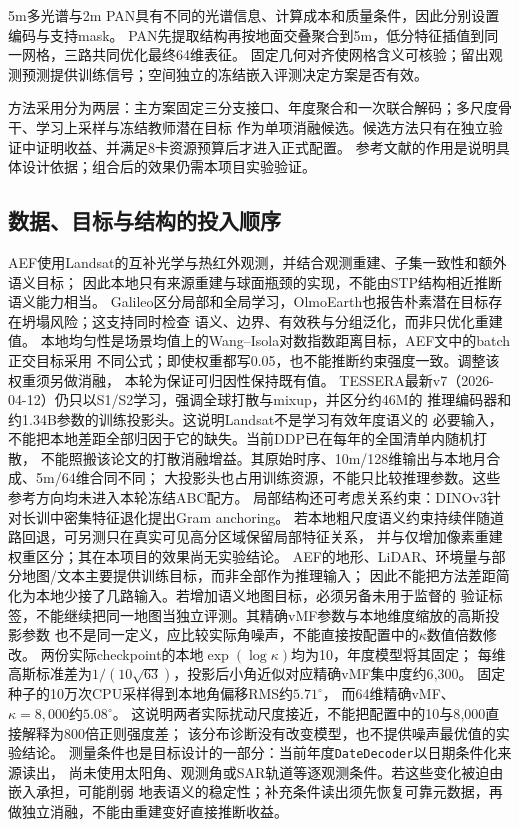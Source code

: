 \documentclass[UTF8,fontset=fandol,zihao=5,a4paper]{ctexart}
\newcommand{\note}[1]{\par\smallskip\noindent\colorbox{pale}{\parbox{0.95\linewidth}{\small #1}}\par\smallskip}
\begin{document}
5m多光谱与2m PAN具有不同的光谱信息、计算成本和质量条件，因此分别设置编码与支持mask。
PAN先提取结构再按地面交叠聚合到5m，低分特征插值到同一网格，三路共同优化最终64维表征。
固定几何对齐使网格含义可核验；留出观测预测提供训练信号；空间独立的冻结嵌入评测决定方案是否有效。

\note{方法采用分为两层：主方案固定三分支接口、年度聚合和一次联合解码；多尺度骨干、学习上采样与冻结教师潜在目标
作为单项消融候选。候选方法只有在独立验证中证明收益、并满足8卡资源预算后才进入正式配置。
参考文献的作用是说明具体设计依据；组合后的效果仍需本项目实验验证。}

\subsection{数据、目标与结构的投入顺序}
AEF使用Landsat的互补光学与热红外观测，并结合观测重建、子集一致性和额外语义目标；
因此本地只有来源重建与球面瓶颈的实现，不能由STP结构相近推断语义能力相当\cite{aef}。
Galileo区分局部和全局学习，OlmoEarth也报告朴素潜在目标存在坍塌风险；这支持同时检查
语义、边界、有效秩与分组泛化，而非只优化重建值\cite{galileo,olmoearth}。
本地均匀性是场景均值上的Wang--Isola对数指数距离目标，AEF文中的batch正交目标采用
不同公式；即使权重都写0.05，也不能推断约束强度一致。调整该权重须另做消融，
本轮为保证可归因性保持既有值。
TESSERA最新v7（2026-04-12）仍只以S1/S2学习，强调全球打散与mixup，并区分约46M的
推理编码器和约1.34B参数的训练投影头\cite{tessera}。这说明Landsat不是学习有效年度语义的
必要输入，不能把本地差距全部归因于它的缺失。当前DDP已在每年的全国清单内随机打散，
不能照搬该论文的打散消融增益。其原始时序、10m/128维输出与本地月合成、5m/64维合同不同；
大投影头也占用训练资源，不能只比较推理参数。这些参考方向均未进入本轮冻结ABC配方。
局部结构还可考虑关系约束：DINOv3针对长训中密集特征退化提出Gram anchoring\cite{dinov3}。
若本地粗尺度语义约束持续伴随道路回退，可另测只在真实可见高分区域保留局部特征关系，
并与仅增加像素重建权重区分；其在本项目的效果尚无实验结论。
AEF的地形、LiDAR、环境量与部分地图/文本主要提供训练目标，而非全部作为推理输入；
因此不能把方法差距简化为本地少接了几路输入。若增加语义地图目标，必须另备未用于监督的
验证标签，不能继续把同一地图当独立评测。其精确vMF参数与本地维度缩放的高斯投影参数
也不是同一定义，应比较实际角噪声，不能直接按配置中的$\kappa$数值倍数修改。
两份实际checkpoint的本地$\exp(\log\kappa)$均为10，年度模型将其固定；
每维高斯标准差为$1/(10\sqrt{63})$，投影后小角近似对应精确vMF集中度约6{,}300。
固定种子的10万次CPU采样得到本地角偏移RMS约$5.71^{\circ}$，
而64维精确vMF、$\kappa=8{,}000$约$5.08^{\circ}$。
这说明两者实际扰动尺度接近，不能把配置中的10与8{,}000直接解释为800倍正则强度差；
该分布诊断没有改变模型，也不提供噪声最优值的实验结论。
测量条件也是目标设计的一部分：当前年度\texttt{DateDecoder}以日期条件化来源读出，
尚未使用太阳角、观测角或SAR轨道等逐观测条件。若这些变化被迫由嵌入承担，可能削弱
地表语义的稳定性；补充条件读出须先恢复可靠元数据，再做独立消融，不能由重建变好直接推断收益。
\end{document}
